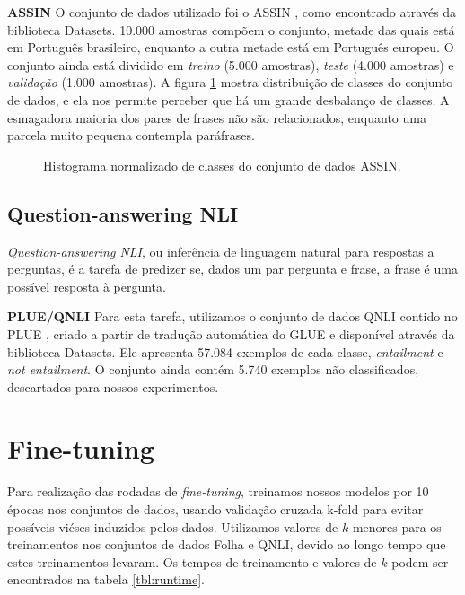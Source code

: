 \documentclass[cic,tc]{iiufrgs}
\begin{document}
\textbf{ASSIN}
O conjunto de dados utilizado foi o ASSIN \cite{fonseca2016assin}, como encontrado através da biblioteca Datasets. 10.000 amostras compõem o conjunto, metade das quais está em Português brasileiro, enquanto a outra metade está em Português europeu. O conjunto ainda está dividido em \emph{treino} (5.000 amostras), \emph{teste} (4.000 amostras) e \emph{validação} (1.000 amostras). A figura \ref{fig:assin_hist} mostra distribuição de classes do conjunto de dados, e ela nos permite perceber que há um grande desbalanço de classes. A esmagadora maioria dos pares de frases não são relacionados, enquanto uma parcela muito pequena contempla paráfrases.

\begin{figure}[h]
    \caption{Histograma normalizado de classes do conjunto de dados ASSIN.}
    \begin{center}
        
    \end{center}
    \label{fig:assin_hist}
\end{figure}


\subsection{Question-answering NLI}
\emph{Question-answering NLI}, ou inferência de linguagem natural para respostas a perguntas, é a tarefa de predizer se, dados um par pergunta e frase, a frase é uma possível resposta à pergunta.

\textbf{PLUE/QNLI} Para esta tarefa, utilizamos o conjunto de dados QNLI contido no PLUE \cite{Gomes2020}, criado a partir de tradução automática do GLUE \cite{wang-etal-2018-glue} e disponível através da biblioteca Datasets. Ele apresenta 57.084 exemplos de cada classe, \emph{entailment} e \emph{not entailment}. O conjunto ainda contém 5.740 exemplos não classificados, descartados para nossos experimentos.


\section{Fine-tuning}
Para realização das rodadas de \emph{fine-tuning}, treinamos nossos modelos por 10 épocas nos conjuntos de dados, usando validação cruzada k-fold para evitar possíveis viéses induzidos pelos dados. Utilizamos valores de $k$ menores para os treinamentos nos conjuntos de dados Folha e QNLI, devido ao longo tempo que estes treinamentos levaram. Os tempos de treinamento e valores de $k$ podem ser encontrados na tabela \ref{tbl:runtime}.
\end{document}
